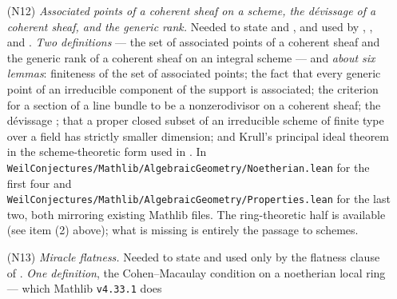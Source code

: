 \begin{enumerate}
{  lemmas}: the twisting sheaf $\O(1)$ on $\mathbf P^N$ and its ampleness; the
  correspondence between a morphism to $\mathbf P^N$ and a globally generated
  line bundle with $N+1$ chosen sections, which is what makes
   available; the fact that an immersion of a
  proper scheme is a closed immersion, which is what makes
   usable; and the five permanence properties collected as
  , of which the fourth --- ample if and only if some
  power is very ample --- is much the hardest and is a genuine theorem, not
  API.  In two new files
  \texttt{WeilConjectures/AlgebraicGeometry/Ample.lean} and
  \texttt{WeilConjectures/AlgebraicGeometry/TwistingSheaf.lean}.
  \emph{This is the largest single item in this chapter's count}, and the one
  most obviously worth upstreaming: nothing in it mentions abelian varieties.
  \item[(N12)] \emph{Associated points of a coherent sheaf on a scheme, the
  d\'evissage of a coherent sheaf, and the generic rank.}  Needed to state
   and , and used by
  , ,
   and .
  \emph{Two definitions} --- the set of associated points of a coherent sheaf
  and the generic rank of a coherent sheaf on an integral scheme --- and
  \emph{about six lemmas}: finiteness of the set of associated points; the
  fact that every generic point of an irreducible component of the support is
  associated; the criterion for a section of a line bundle to be a
  nonzerodivisor on a coherent sheaf; the d\'evissage
  ; that a proper closed subset of an irreducible
  scheme of finite type over a field has strictly smaller dimension; and
  Krull's principal ideal theorem in the scheme-theoretic form used in
  .  In
  \texttt{WeilConjectures/Mathlib/AlgebraicGeometry/Noetherian.lean} for the
  first four and
  \texttt{WeilConjectures/Mathlib/AlgebraicGeometry/Properties.lean} for the
  last two, both mirroring existing Mathlib files.  The ring-theoretic half is
  available (see item (2) above); what is missing is entirely the passage to
  schemes.
  \item[(N13)] \emph{Miracle flatness.}  Needed to state
   and used only by the flatness clause of
  .  \emph{One definition}, the Cohen--Macaulay
  condition on a noetherian local ring --- which Mathlib \texttt{v4.33.1} does

\end{enumerate}
